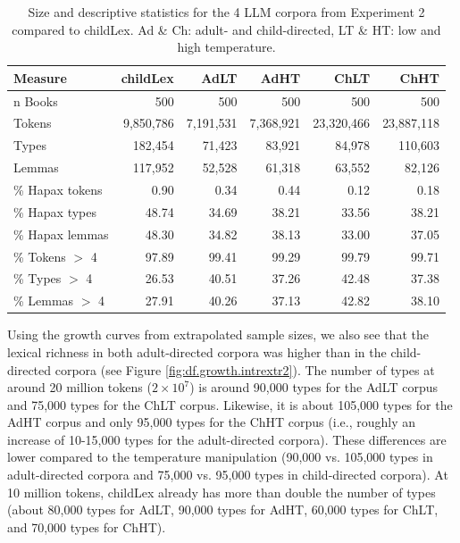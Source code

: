 \documentclass[doc, a4paper]{apa7}
\begin{document}
\begin{table}[!htbp]
\caption{Size and descriptive statistics for the 4 LLM corpora from Experiment 2 compared to childLex. Ad \& Ch: adult- and child-directed, LT \& HT: low and high temperature.}
\centering
\begin{tabular}{lrrrrr}
  \hline
    Measure & childLex & AdLT & AdHT & ChLT & ChHT \\ 
  \hline
n Books & 500 & 500 & 500 & 500 & 500 \\ 
  Tokens & 9,850,786 & 7,191,531 & 7,368,921 & 23,320,466 & 23,887,118 \\ 
  Types & 182,454 & 71,423 & 83,921 & 84,978 & 110,603 \\ 
  Lemmas & 117,952 & 52,528 & 61,318 & 63,552 & 82,126 \\ 
  \% Hapax tokens & 0.90 & 0.34 & 0.44 & 0.12 & 0.18 \\ 
  \% Hapax types & 48.74 & 34.69 & 38.21 & 33.56 & 38.21 \\ 
  \% Hapax lemmas & 48.30 & 34.82 & 38.13 & 33.00 & 37.05 \\ 
  \% Tokens $>$ 4 & 97.89 & 99.41 & 99.29 & 99.79 & 99.71 \\ 
  \% Types $>$ 4 & 26.53 & 40.51 & 37.26 & 42.48 & 37.38 \\ 
  \% Lemmas $>$ 4 & 27.91 & 40.26 & 37.13 & 42.82 & 38.10 \\ 
   \hline
\end{tabular}
\label{freqComp2}
\end{table}

Using the growth curves from extrapolated sample sizes, we also see that the lexical richness in both adult-directed corpora was higher than in the child-directed corpora (see Figure \ref{fig:df.growth.intrextr2}). The number of types at around 20 million tokens ($2 \times 10^7$) is around 90,000 types for the AdLT corpus and 75,000 types for the ChLT corpus. Likewise, it is about 105,000 types for the AdHT corpus and only 95,000 types for the ChHT corpus (i.e., roughly an increase of 10-15,000 types for the adult-directed corpora). These differences are lower compared to the temperature manipulation (90,000 vs. 105,000 types in adult-directed corpora and 75,000 vs. 95,000 types in child-directed corpora). At 10 million tokens, childLex already has more than double the number of types (about 80,000 types for AdLT, 90,000 types for AdHT, 60,000 types for ChLT, and 70,000 types for ChHT). 
\end{document}
